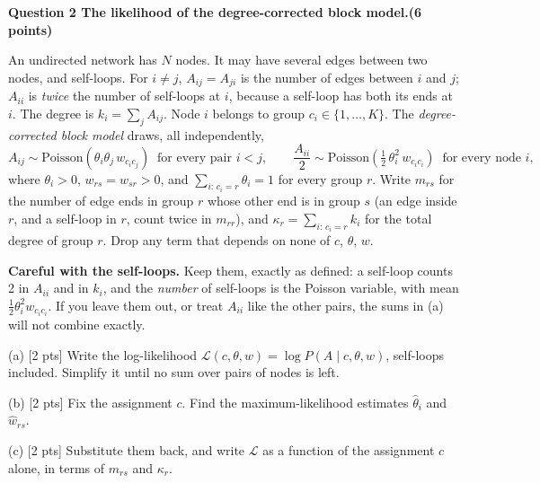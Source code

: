\documentclass[a4paper, 11pt]{extarticle}
\renewcommand{\question}[3]{%
  \vspace{0.4em}
  {\large\bfseries Question #1 \quad #3\quad\normalsize\mdseries (#2 points)}\par
  \vspace{-0.4em}{\color{rulegrey}\rule{\textwidth}{0.6pt}}\par}
\begin{document}
\question{2}{6}{The likelihood of the degree-corrected block model.}

\begin{tcolorbox}[colback=pltblue!4, colframe=pltblue!35, boxrule=0.5pt,
                  sharp corners, boxsep=2pt, left=6pt, right=6pt,
                  top=4pt, bottom=4pt]
{\small
An undirected network has $N$ nodes. It may have several edges between two
nodes, and self-loops. For $i \neq j$, $A_{ij} = A_{ji}$ is the number of edges
between $i$ and $j$; $A_{ii}$ is \emph{twice} the number of self-loops at $i$,
because a self-loop has both its ends at $i$. The degree is
$k_i = \sum_j A_{ij}$. Node $i$ belongs to group $c_i \in \{1, \dots, K\}$.
The \emph{degree-corrected block model} draws, all independently,
\[
  A_{ij} \sim \mathrm{Poisson}\!\left(\theta_i \theta_j\, w_{c_i c_j}\right)
  \ \text{ for every pair } i < j,
  \qquad
  \frac{A_{ii}}{2} \sim \mathrm{Poisson}\!\left(\tfrac12\, \theta_i^2\, w_{c_i c_i}\right)
  \ \text{ for every node } i,
\]
where $\theta_i > 0$, $w_{rs} = w_{sr} > 0$, and
$\sum_{i:\,c_i = r} \theta_i = 1$ for every group $r$. Write $m_{rs}$ for the
number of edge ends in group $r$ whose other end is in group $s$ (an edge
inside $r$, and a self-loop in $r$, count twice in $m_{rr}$), and
$\kappa_r = \sum_{i:\,c_i = r} k_i$ for the total degree of group $r$. Drop
any term that depends on none of $c$, $\theta$, $w$.

\vspace{0.3em}
\textbf{Careful with the self-loops.} Keep them, exactly as defined: a
self-loop counts 2 in $A_{ii}$ and in $k_i$, and the \emph{number} of
self-loops is the Poisson variable, with mean $\tfrac12 \theta_i^2 w_{c_ic_i}$.
If you leave them out, or treat $A_{ii}$ like the other pairs, the sums in (a)
will not combine exactly.
}
\end{tcolorbox}

(a) [2 pts] Write the log-likelihood
$\mathcal{L}(c, \theta, w) = \log P(A \mid c, \theta, w)$, self-loops
included. Simplify it until no sum over pairs of nodes is left.

(b) [2 pts] Fix the assignment $c$. Find the maximum-likelihood estimates
$\hat{\theta}_i$ and $\hat{w}_{rs}$.

(c) [2 pts] Substitute them back, and write $\mathcal{L}$ as a function of the
assignment $c$ alone, in terms of $m_{rs}$ and $\kappa_r$.

\vfill
\end{document}

